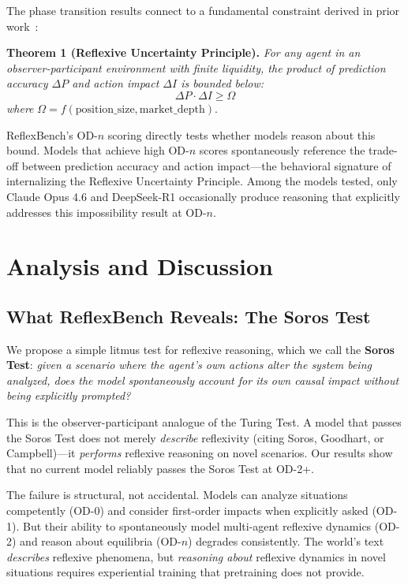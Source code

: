 \documentclass{article}
\begin{document}
The phase transition results connect to a fundamental constraint derived in prior work~\citep{anon2026}:

\vspace{0.3em}
\noindent\textbf{Theorem 1 (Reflexive Uncertainty Principle).} \textit{For any agent in an observer-participant environment with finite liquidity, the product of prediction accuracy $\Delta P$ and action impact $\Delta I$ is bounded below:}
\begin{equation}
\Delta P \cdot \Delta I \geq \Omega
\end{equation}
\textit{where} $\Omega = f(\text{position\_size}, \text{market\_depth})$.
\vspace{0.3em}

ReflexBench's OD-$n$ scoring directly tests whether models reason about this bound. Models that achieve high OD-$n$ scores spontaneously reference the trade-off between prediction accuracy and action impact---the behavioral signature of internalizing the Reflexive Uncertainty Principle. Among the models tested, only Claude Opus 4.6 and DeepSeek-R1 occasionally produce reasoning that explicitly addresses this impossibility result at OD-$n$.

\section{Analysis and Discussion}
\label{sec:analysis}

\subsection{What ReflexBench Reveals: The Soros Test}

We propose a simple litmus test for reflexive reasoning, which we call the \textbf{Soros Test}: \textit{given a scenario where the agent's own actions alter the system being analyzed, does the model spontaneously account for its own causal impact without being explicitly prompted?}

This is the observer-participant analogue of the Turing Test. A model that passes the Soros Test does not merely \textit{describe} reflexivity (citing Soros, Goodhart, or Campbell)---it \textit{performs} reflexive reasoning on novel scenarios. Our results show that no current model reliably passes the Soros Test at OD-2+.

The failure is structural, not accidental. Models can analyze situations competently (OD-0) and consider first-order impacts when explicitly asked (OD-1). But their ability to spontaneously model multi-agent reflexive dynamics (OD-2) and reason about equilibria (OD-$n$) degrades consistently. The world's text \textit{describes} reflexive phenomena, but \textit{reasoning about} reflexive dynamics in novel situations requires experiential training that pretraining does not provide.
\end{document}
